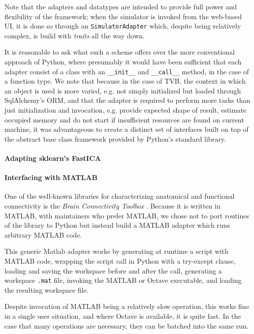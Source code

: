 Note that the adapters and datatypes are intended to provide full 
power and flexibility of the framework; when the simulator is invoked from
the web-based UI, it is done so through an \texttt{SimulatorAdapter} which,
despite being relatively complex, is build with \emph{traits} all the way down.

It is reasonable to ask what such a scheme offers over the more 
conventional approach of Python, where presumably it would have been
sufficient that each adapter consist of a class with an \texttt{\_\_init\_\_}
and \texttt{\_\_call\_\_} method, in the case of a function type. 
We note that because in the case of TVB, the context in which an object
is used is more varied, e.g. not simply initialized but loaded through 
SqlAlchemy's ORM, and that the adapter is required to perform more tasks
than just initialization and invocation, e.g. provide expected shape of 
result, estimate occupied memory and do not start if insufficient resources are found on current machine,
 it was advantageous to create a distinct set of interfaces built on top of
the abstract base class framework provided by Python's standard library.

\paragraph{Adapting sklearn's FastICA}


\paragraph{Interfacing with MATLAB}

One of the well-known libraries for characterizing anatomical 
and functional connectivity is the \emph{Brain Connectivity Toolbox} 
\cite{Rubinov_2010}. 
Because it is written in MATLAB, with maintainers who prefer MATLAB, we 
chose not to port routines of the library to Python but instead build
a MATLAB adapter which runs arbitrary MATLAB code. 

This generic Matlab adapter works by generating at runtime a script with MATLAB code, 
wrapping the script call in Python with a try-except clause,  
loading and saving the workspace before and after the call,
generating a workspace \texttt{.mat} file, invoking the MATLAB or Octave
executable, and loading the resulting workspace file. 

Despite invocation of MATLAB being a relatively slow operation, this works fine in a single
user situation, and where Octave is available, it is quite fast. In the 
case that many operations are necessary, they can be batched into the 
same run.


